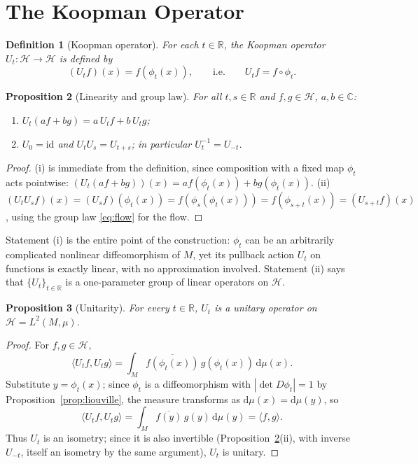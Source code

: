 \documentclass[11pt]{article}
\newtheorem{proposition}{Proposition}[section]
\newtheorem{definition}[proposition]{Definition}
\theoremstyle{remark}
\newcommand{\dd}{\mathrm{d}}
\newcommand{\R}{\mathbb{R}}
\newcommand{\C}{\mathbb{C}}
\begin{document}
\section{The Koopman Operator}
\label{sec:koopman}

\begin{definition}[Koopman operator]
For each $t\in\R$, the Koopman operator $U_t:\mathcal H\to\mathcal H$ is defined by
\begin{equation}
(U_t f)(x) = f(\phi_t(x)), \qquad\text{i.e.}\qquad U_t f = f\circ\phi_t.
\end{equation}
\end{definition}

\begin{proposition}[Linearity and group law]
\label{prop:linear-group}
For all $t,s\in\R$ and $f,g\in\mathcal H$, $a,b\in\C$:
\begin{enumerate}[label=(\roman*)]
\item $U_t(af+bg) = a\,U_tf+b\,U_tg$;
\item $U_0=\mathrm{id}$ and $U_tU_s=U_{t+s}$; in particular $U_t^{-1}=U_{-t}$.
\end{enumerate}
\end{proposition}
\begin{proof}
(i) is immediate from the definition, since composition with a fixed map $\phi_t$ acts pointwise: $(U_t(af+bg))(x) = af(\phi_t(x))+bg(\phi_t(x))$. (ii) $(U_tU_sf)(x) = (U_sf)(\phi_t(x)) = f(\phi_s(\phi_t(x))) = f(\phi_{s+t}(x)) = (U_{s+t}f)(x)$, using the group law \eqref{eq:flow} for the flow.
\end{proof}

Statement (i) is the entire point of the construction: $\phi_t$ can be an arbitrarily complicated nonlinear diffeomorphism of $M$, yet its pullback action $U_t$ on functions is exactly linear, with no approximation involved. Statement (ii) says that $\{U_t\}_{t\in\R}$ is a one-parameter group of linear operators on $\mathcal H$.

\begin{proposition}[Unitarity]
\label{prop:unitary}
For every $t\in\R$, $U_t$ is a unitary operator on $\mathcal H=L^2(M,\mu)$.
\end{proposition}
\begin{proof}
For $f,g\in\mathcal H$,
\begin{equation}
\langle U_tf,U_tg\rangle = \int_M \overline{f(\phi_t(x))}\,g(\phi_t(x))\,\dd\mu(x).
\end{equation}
Substitute $y=\phi_t(x)$; since $\phi_t$ is a diffeomorphism with $\left|\det D\phi_t\right|=1$ by Proposition~\ref{prop:liouville}, the measure transforms as $\dd\mu(x)=\dd\mu(y)$, so
\begin{equation}
\langle U_tf,U_tg\rangle = \int_M \overline{f(y)}\,g(y)\,\dd\mu(y) = \langle f,g\rangle.
\end{equation}
Thus $U_t$ is an isometry; since it is also invertible (Proposition~\ref{prop:linear-group}(ii), with inverse $U_{-t}$, itself an isometry by the same argument), $U_t$ is unitary.
\end{proof}
\end{document}

